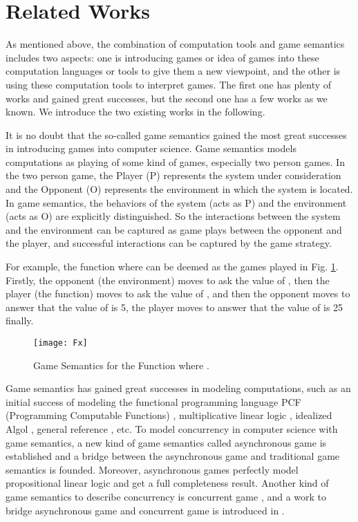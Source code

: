 \documentclass{fac}
\begin{document}
\section{Related Works}\label{RelatedWorks}

As mentioned above, the combination of computation tools and game semantics includes two aspects: one is introducing games or idea of games into these computation languages or tools to give them a new viewpoint, and the other is using these computation tools to interpret games. The first one has plenty of works and gained great successes, but the second one has a few works \cite{GameCTR} \cite{GameProcess} as we known. We introduce the two existing works in the following.

It is no doubt that the so-called game semantics gained the most great successes in introducing games into computer science. Game semantics models computations as playing of some kind of games, especially two person games. In the two person game, the Player (P) represents the system under consideration and the Opponent (O) represents the environment in which the system is located. In game semantics, the behaviors of the system (acts as P) and the environment (acts as O) are explicitly distinguished. So the interactions between the system and the environment can be captured as game plays between the opponent and the player, and successful interactions can be captured by the game strategy.

For example, the function  where  can be deemed as the games played in Fig. \ref{F(x)}. Firstly, the opponent (the environment) moves to ask the value of , then the player (the function) moves to ask the value of , and then the opponent moves to answer that the value of  is 5, the player moves to answer that the value of  is 25 finally.

\begin{figure}
  \centering
\texttt{[image: Fx]}
  \caption{Game Semantics for the Function  where .}
  \label{F(x)}
\end{figure}

Game semantics has gained great successes in modeling computations, such as an initial success of modeling the functional programming language PCF (Programming Computable Functions) \cite{PCF} \cite{PCF2} \cite{PCF3}, multiplicative linear logic \cite{MIL}, idealized Algol \cite{Algol}, general reference \cite{GR}, etc. To model concurrency in computer science with game semantics, a new kind of game semantics called asynchronous game \cite{AsynGame1} \cite{AsynGame2} \cite{AsynGame3} \cite{AsynGame4} \cite{AsynGame5} is established and a bridge between the asynchronous game and traditional game semantics is founded. Moreover, asynchronous games perfectly model propositional linear logic and get a full completeness result. Another kind of game semantics to describe concurrency is concurrent game \cite{ConGame1} \cite{ConGame2}, and a work to bridge asynchronous game and concurrent game is introduced in \cite{AsynAndConGame}.
\end{document}
